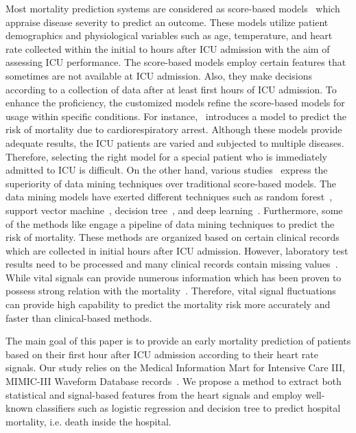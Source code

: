 \documentclass[3p]{elsarticle}
\begin{document}
Most mortality prediction systems are considered as score-based models~\cite{calvert_using_2016}\cite{simpson_new_2016}\cite{le_gall_new_1993}\cite{knaus_apache_1985} which appraise disease severity to predict an outcome. These models utilize patient demographics and physiological variables such as age, temperature, and heart rate collected within the initial  to  hours after ICU admission with the aim of assessing ICU performance. The score-based models employ certain features that sometimes are not available at ICU admission. Also, they make decisions according to a collection of data after at least first  hours of ICU admission. To enhance the proficiency, the customized models refine the score-based models for usage within specific conditions. For instance,~\cite{dervishi_fuzzy_2017} introduces a model to predict the risk of mortality due to cardiorespiratory arrest. Although these models provide adequate results, the ICU patients are varied and subjected to multiple diseases. Therefore, selecting the right model for a special patient who is immediately admitted to ICU is difficult. On the other hand, various studies~\cite{awad_early_2017}\cite{wojtusiak_c-lace:_2017}\cite{ribas_severe_2011}\cite{kim_comparison_2011}\cite{purushotham_benchmark_2017} express the superiority of data mining techniques over traditional score-based models. The data mining models have exerted different techniques such as  random forest~\cite{awad_early_2017}\cite{wojtusiak_c-lace:_2017}, support vector machine~\cite{ribas_severe_2011}, decision tree~\cite{kim_comparison_2011}, and deep learning~\cite{purushotham_benchmark_2017}\cite{avati_improving_2017}\cite{beaulieu-jones_mapping_2017}\cite{song_attend_2017}. Furthermore, some of the methods like \cite{venugopalan_combination_2017} engage a pipeline of data mining techniques to predict the risk of mortality. These methods are organized based on certain clinical records which are collected in initial hours after ICU admission. However, laboratory test results need to be processed and many clinical records contain missing values~\cite{yadav_mining_2018}. While vital signals can provide numerous information which has been proven to possess strong relation with the mortality~\cite{zhang_resting_2015}. Therefore, vital signal fluctuations can provide high capability to predict the mortality risk more accurately and faster than clinical-based methods.

The main goal of this paper is to provide an early mortality prediction of patients based on their first hour after ICU admission according to their heart rate signals. Our study relies on the Medical Information Mart for Intensive Care III, MIMIC-III Waveform Database records~\cite{johnson_mimic-iii_2016}. We propose a method to extract both statistical and signal-based features from the heart signals and employ well-known classifiers such as logistic regression and decision tree to predict hospital mortality, i.e. death inside the hospital.
\end{document}
